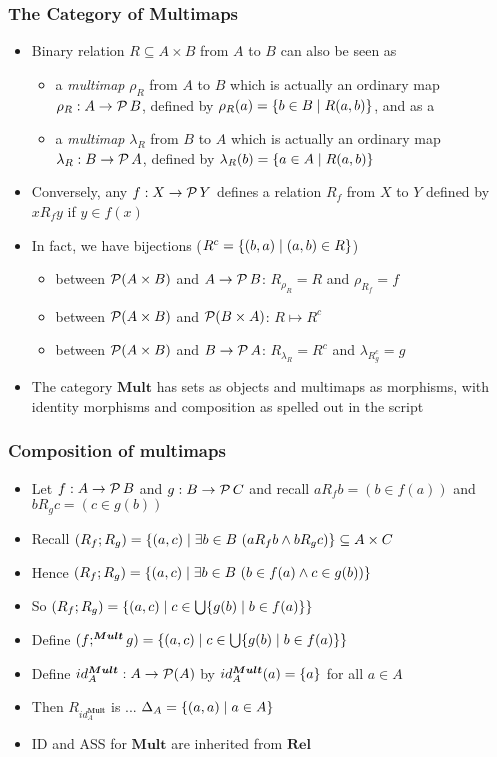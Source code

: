 \documentclass[handout]{beamer}
\newcommand{\bfsf}[1]{{\boldsymbol{#1}}}
\newcommand{\Rel}{\bfsf{Rel}}
\newcommand{\Mult}{\bfsf{Mult}}
\begin{document}
\frame
  {   
    \frametitle{The Category of Multimaps}\label{Ch2:Multimaps}
 \begin{itemize}[<+->]
\item Binary relation $R\subseteq A\times B$ from $A$ to $B$  can also be seen as 
\begin{itemize}[<+->]
\item a \emph{multimap} $\rho_R$ from $A$ to $B$ which is
actually an ordinary map  $\rho_R : A\to \operatorname{\mathcal{P}}{B}$, 
defined by $\rho_R(a) = \{b\in B\mid R(a,b)\}$, and as a
\item a \emph{multimap} $\lambda_R$ from $B$ to $A$ which is
actually an ordinary map  $\lambda_R : B\to \operatorname{\mathcal{P}}{A}$, 
defined by $\lambda_R(b) = \{a\in A\mid R(a,b)\}$
\end{itemize}
\item Conversely, any $f : X\to \operatorname{\mathcal{P}}{Y}$ defines a relation $R_f$ from $X$ to $Y$
defined by $xR_f y$ if $y\in f(x)$
\item In fact, we have bijections ($R^c = \{(b,a)\mid (a,b)\in R\}$)
\begin{itemize}[<+->]
\item between $\operatorname{\mathcal{P}}(A\times B)$ and $A\to \operatorname{\mathcal{P}}{B}$: $R_{\rho_R} = R$ and 
$\rho_{R_f} = f$
\item between $\operatorname{\mathcal{P}}(A\times B)$ and $\operatorname{\mathcal{P}}(B\times A)$: $R\mapsto R^c$
\item between $\operatorname{\mathcal{P}}(A\times B)$ and $B\to \operatorname{\mathcal{P}}{A}$: $R_{\lambda_R} = R^c$ and $\lambda_{R^c_g} = g$
 \end{itemize}
\item The category $\Mult$ has sets as objects and multimaps as morphisms,
with identity morphisms and composition as spelled out in the script 
 \end{itemize}

 }

\frame
  {   
    \frametitle{Composition of multimaps}\label{Ch2:compmultimap}

 \begin{itemize}[<+->]
\item Let $f : A\to \operatorname{\mathcal{P}}{B}$ and $g : B\to \operatorname{\mathcal{P}}{C}$ and
recall $aR_fb = (b\in f(a))$ and $bR_g c = (c\in g(b))$
\item Recall $(R_f;R_g) = \{(a,c) \mid \exists b\in B~(aR_fb\wedge bR_gc)\}\subseteq A\times C$
\item Hence $(R_f;R_g) = \{(a,c) \mid \exists b\in B~(b\in f(a)\wedge c\in g(b))\}$
\item So $(R_f;R_g) = \{(a,c) \mid c\in \bigcup \{g(b)\mid b\in f(a)\}\}$
\item Define $(f;^\Mult g) = \set{(a,c) \mid c\in \bigcup \set{g(b)\mid b\in f(a)}}$
\item Define $id^\Mult_A: A\to \powset(A)$ by $id^\Mult_A(a) = \set{a}$ for all $a\in A$
\item Then $R_{id^\Mult_A}$ is ... $\Delta_A = \{(a,a)\mid a\in A \}$
\item ID and ASS for $\Mult$ are inherited from $\Rel$
 \end{itemize}

 }
\end{document}
